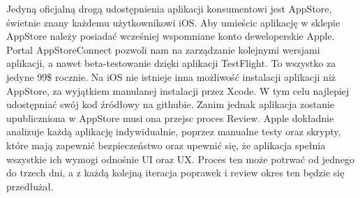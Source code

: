 \documentclass{article}
\begin{document}
Jedyną oficjalną drogą udostępnienia aplikacji konsumentowi jest AppStore, świetnie
znany każdemu użytkownikowi iOS\@. Aby umieścic aplikację w sklepie AppStore
należy posiadać wcześniej wspomniane konto deweloperskie Apple. Portal AppStoreConnect
pozwoli nam na zarządzanie kolejnymi wersjami aplikacji, a nawet beta-testowanie
dzięki aplikacji TestFlight. To wszystko za jedyne 99\$ rocznie. Na iOS nie istnieje
inna możliwość instalacji aplikacji niż AppStore, za wyjątkiem manulanej instalacji
przez Xcode. W tym celu najlepiej udostępniać swój kod źródłowy na githubie. Zanim 
jednak aplikacja zostanie upubliczniona w AppStore musi ona przejsc proces Review.
Apple dokładnie analizuje każdą aplikację indywidualnie, poprzez manualne testy oraz
skrypty, które mają zapewnić bezpieczeństwo oraz upewnić się, że aplikacja spełnia
wszystkie ich wymogi odnośnie UI oraz UX\@. Proces ten może potrwać od jednego do trzech
dni, a z każdą kolejną iteracja poprawek i review okres ten będzie się przedłużał.
\end{document}
